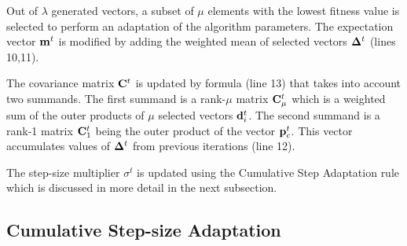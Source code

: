 \documentclass[runningheads,a4paper]{llncs}
\newcommand{\wek}[1]{
    {\bf #1} 
}
\newcommand{\mat}[1]{
    {\bf #1} 
}
\begin{document}

Out of $\lambda$ generated vectors, a subset of $\mu$ elements with the lowest fitness value is selected to perform an adaptation of the algorithm parameters.
The expectation vector $\wek{m}^t$ is modified by adding the weighted mean of selected vectors $\wek{\Delta}^t$ (lines 10,11). 

The covariance matrix $\mat{C}^t$ is updated by formula (line 13) that takes into account two summands. The first summand is a rank-$\mu$ matrix $\mat{C}^t_\mu$ which is a weighted sum of the outer products of $\mu$ selected vectors $\wek{d}_i^t$. The second summand is a rank-1 matrix $\mat{C}^t_1$ being the outer product of the vector $\wek{p}_c^t$. This vector accumulates values of $\wek{\Delta}^t$ from previous iterations (line 12).

The step-size multiplier $\sigma^t$ is updated using the Cumulative Step Adaptation rule which is discussed in more detail in the next subsection. 



\subsection{Cumulative Step-size Adaptation}
\end{document}
